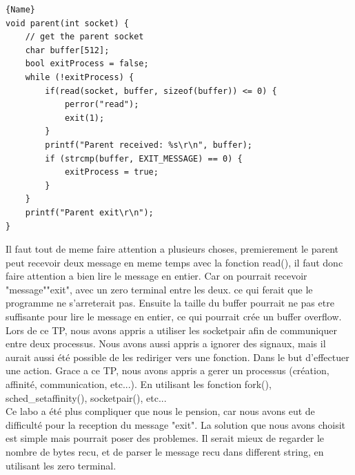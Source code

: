 \documentclass[
	a4paper, %
	10pt, %
]{CSUniSchoolLabReport}
\begin{document}
\begin{minipage}{.45\textwidth}
\begin{lstlisting}[style=CStyle, caption=Processus Parent, firstnumber=1]{Name}
void parent(int socket) {
	// get the parent socket
	char buffer[512];
	bool exitProcess = false;
	while (!exitProcess) {
		if(read(socket, buffer, sizeof(buffer)) <= 0) {
			perror("read");
			exit(1);
		}
		printf("Parent received: %s\r\n", buffer);
		if (strcmp(buffer, EXIT_MESSAGE) == 0) {
			exitProcess = true;
		}
	}
	printf("Parent exit\r\n");
}
\end{lstlisting}
\end{minipage}
Il faut tout de meme faire attention a plusieurs choses, premierement le parent peut recevoir deux message en meme temps avec la fonction read(), il faut donc faire attention a bien lire le message en entier.
Car on pourrait recevoir "message""exit", avec un zero terminal entre les deux. ce qui ferait que le programme ne s'arreterait pas.
Ensuite la taille du buffer pourrait ne pas etre suffisante pour lire le message en entier, ce qui pourrait crée un buffer overflow.\\

Lors de ce TP, nous avons appris a utiliser les socketpair afin de communiquer entre deux processus.
Nous avons aussi appris a ignorer des signaux, mais il aurait aussi été possible de les rediriger vers une fonction. Dans le but d'effectuer une action.
Grace a ce TP, nous avons appris a gerer un processus (création, affinité, communication, etc...). En utilisant les fonction fork(), sched\_setaffinity(), socketpair(), etc...\\

Ce labo a été plus compliquer que nous le pension, car nous avons eut de difficulté pour la reception du message "exit". La solution que nous avons choisit est simple mais pourrait poser des problemes.
Il serait mieux de regarder le nombre de bytes recu, et de parser le message recu dans different string, en utilisant les zero terminal.
\end{document}
